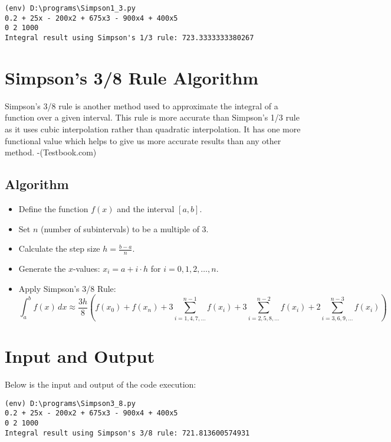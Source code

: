 \documentclass[12pt]{article}
\begin{document}
{\small
\begin{verbatim}
(env) D:\programs\Simpson1_3.py
0.2 + 25x - 200x2 + 675x3 - 900x4 + 400x5
0 2 1000 
Integral result using Simpson's 1/3 rule: 723.3333333380267
\end{verbatim}
}



\newpage
\section*{Simpson's 3/8 Rule Algorithm}

Simpson's 3/8 rule is another method used to approximate the integral of a function over a given interval. This rule is more accurate than Simpson's 1/3 rule as it uses cubic interpolation rather than quadratic interpolation. It has one more functional value which helps to give us more accurate results than any other method. -(Testbook.com)
\subsection*{Algorithm}
\begin{itemize}
    \item Define the function \( f(x) \) and the interval \([a, b]\).
    \item Set \( n \) (number of subintervals) to be a multiple of 3.
    \item Calculate the step size \( h = \frac{b - a}{n} \).
    \item Generate the \( x \)-values: \( x_i = a + i \cdot h \) for \( i = 0, 1, 2, \ldots, n \).
    \item Apply Simpson's 3/8 Rule:
    \[
        \int_a^b f(x) \, dx \approx \frac{3h}{8} \left( f(x_0) + f(x_n) + 3 \sum_{i=1,4,7,\ldots}^{n-1} f(x_i) + 3 \sum_{i=2,5,8,\ldots}^{n-2} f(x_i) + 2 \sum_{i=3,6,9,\ldots}^{n-3} f(x_i) \right)
        \]
        
    \end{itemize}
    \section*{Input and Output}
    \noindent Below is the input and output of the code execution:
                
    {\small
    \begin{verbatim}
(env) D:\programs\Simpson3_8.py
0.2 + 25x - 200x2 + 675x3 - 900x4 + 400x5
0 2 1000
Integral result using Simpson's 3/8 rule: 721.813600574931
    \end{verbatim}
    }
\end{document}
